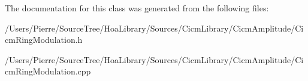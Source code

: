 The documentation for this class was generated from the following files\-:\begin{DoxyCompactItemize}
\item 
/\-Users/\-Pierre/\-Source\-Tree/\-Hoa\-Library/\-Sources/\-Cicm\-Library/\-Cicm\-Amplitude/Cicm\-Ring\-Modulation.\-h\item 
/\-Users/\-Pierre/\-Source\-Tree/\-Hoa\-Library/\-Sources/\-Cicm\-Library/\-Cicm\-Amplitude/Cicm\-Ring\-Modulation.\-cpp\end{DoxyCompactItemize}
